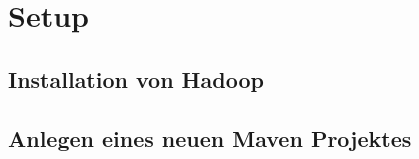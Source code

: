
\chapter{Setup}\label{cha:Setup}

\section{Installation von Hadoop}

\section{Anlegen eines neuen Maven Projektes}